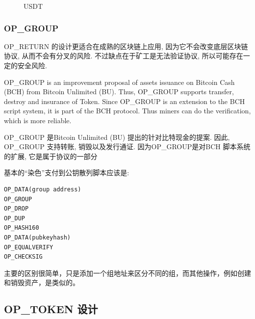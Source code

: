\documentclass[a4paper,11pt]{article}
\begin{document}
\begin{figure}[hbt]
	\centerline{%
	}
\caption{USDT}
\end{figure}




\subsubsection*{OP\_GROUP}
OP\_RETURN 的设计更适合在成熟的区块链上应用, 因为它不会改变底层区块链协议, 从而不会有分叉的风险. 不过缺点在于矿工是无法验证协议, 所以可能存在一定的安全风险.

OP\_GROUP\cite{OP_GROUP}  is an improvement proposal of assets issuance on Bitcoin Cash (BCH)\cite{BCH} from Bitcoin Unlimited (BU). Thus, OP\_GROUP  supports transfer, destroy and insurance of Token. Since OP\_GROUP is an extension to the BCH script system,  it is part of the BCH protocol. Thus miners can do the verification, which is more reliable.

OP\_GROUP\cite{OP_GROUP} 是Bitcoin Unlimited (BU) 提出的针对比特现金\cite{BCH}的提案. 因此, OP\_GROUP 支持转账, 销毁以及发行通证. 因为OP\_GROUP是对BCH 脚本系统的扩展, 它是属于协议的一部分	 


基本的“染色”支付到公钥散列脚本应该是:

\lstset{basicstyle=\tiny,style=myListStyle}
\begin{lstlisting}[numbers=none]
OP_DATA(group address)
OP_GROUP
OP_DROP
OP_DUP
OP_HASH160
OP_DATA(pubkeyhash)
OP_EQUALVERIFY
OP_CHECKSIG
\end{lstlisting}

主要的区别很简单，只是添加一个组地址来区分不同的组，而其他操作，例如创建和销毁资产，是类似的。


\subsection{OP\_TOKEN 设计}
\end{document}
